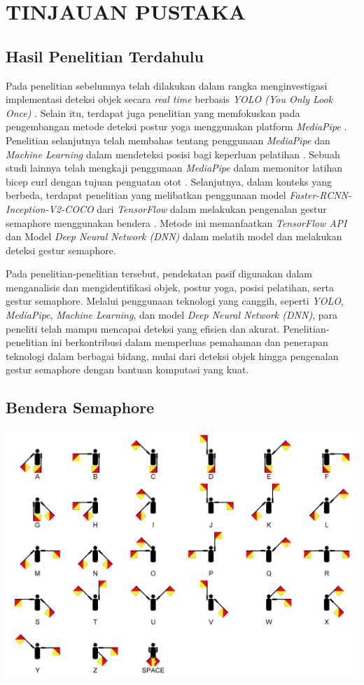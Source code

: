 \chapter{TINJAUAN PUSTAKA}

\section{Hasil Penelitian Terdahulu}
Pada penelitian sebelumnya telah dilakukan dalam rangka menginvestigasi implementasi deteksi objek secara \textit{real time} berbasis \textit{YOLO (You Only Look Once)} \cite{redmon2016you}. Selain itu, terdapat juga penelitian yang memfokuskan pada pengembangan metode deteksi postur yoga menggunakan platform \textit{MediaPipe} \cite{garg2022yoga}. Penelitian selanjutnya telah membahas tentang penggunaan \textit{MediaPipe} dan \textit{Machine Learning} dalam mendeteksi posisi bagi keperluan pelatihan \cite{supanich2023machine}. Sebuah studi lainnya telah mengkaji penggunaan \textit{MediaPipe} dalam memonitor latihan bicep curl dengan tujuan penguatan otot \cite{nguyen2023assessing}. Selanjutnya, dalam konteks yang berbeda, terdapat penelitian yang melibatkan penggunaan model \textit{Faster-RCNN-Inception-V2-COCO} dari \textit{TensorFlow} dalam melakukan pengenalan gestur semaphore menggunakan bendera \cite{motty2023flag}. Metode ini memanfaatkan \textit{TensorFlow API} dan Model \textit{Deep Neural Network (DNN)} dalam melatih model dan melakukan deteksi gestur semaphore.

Pada penelitian-penelitian tersebut, pendekatan pasif digunakan dalam menganalisis dan mengidentifikasi objek, postur yoga, posisi pelatihan, serta gestur semaphore. Melalui penggunaan teknologi yang canggih, seperti \textit{YOLO}, \textit{MediaPipe}, \textit{Machine Learning}, dan model \textit{Deep Neural Network (DNN)}, para peneliti telah mampu mencapai deteksi yang efisien dan akurat. Penelitian-penelitian ini berkontribusi dalam memperluas pemahaman dan penerapan teknologi dalam berbagai bidang, mulai dari deteksi objek hingga pengenalan gestur semaphore dengan bantuan komputasi yang kuat.

\section{Bendera Semaphore}
\begin{center}
	\includegraphics[width=0.7\linewidth]{gambar/bener/Semaphore-Pose.jpg}
	\label{fig:BenderaSemaphore}
\end{center}

